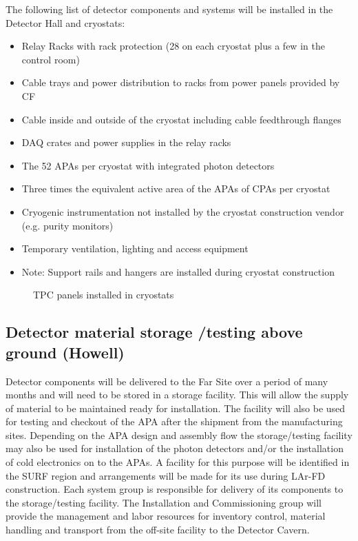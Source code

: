 The following list of detector components and systems will be installed in the Detector Hall and cryostats: 

\begin{itemize}
\item Relay Racks with rack protection (28 on each cryostat plus a few in the control room) 
\item Cable trays and power distribution to racks from power panels provided by CF 
\item Cable inside and outside of the cryostat including cable feedthrough flanges 
\item DAQ crates and power supplies in the relay racks 
\item The 52 APAs per cryostat with integrated photon detectors 
\item Three times the equivalent active area of the APAs of CPAs per cryostat 
\item Cryogenic instrumentation not installed by the cryostat construction vendor (e.g. purity monitors) 
\item Temporary ventilation, lighting and access equipment 
\item Note: Support rails and hangers are installed during cryostat construction 
\end{itemize}

\begin{figure}[htbp]
\centering
\caption{TPC panels installed in cryostats } 
\label{fig:tpc-panels-in-cryostat}
\end{figure}

\subsection{Detector material storage /testing above ground (Howell)}
\label{fd:install:fsinstall:mat:storage}

Detector components will be delivered to the Far Site over a period of many months and will need to be stored in a storage facility. This will allow the supply of material to be maintained ready for installation. The facility will 
also be used for testing and checkout of the APA after the shipment from the manufacturing sites. Depending on the APA design and assembly flow the storage/testing facility may also be used for installation of the photon 
detectors and/or the installation of cold electronics on to the APAs.  A facility for this purpose will be identified in the SURF region and arrangements will be made for its use during LAr-FD construction. Each system group is 
responsible for delivery of its components to the storage/testing facility. The Installation and Commissioning group will provide the management and labor resources for inventory control, material handling and transport from the off-site facility to the Detector Cavern. 


